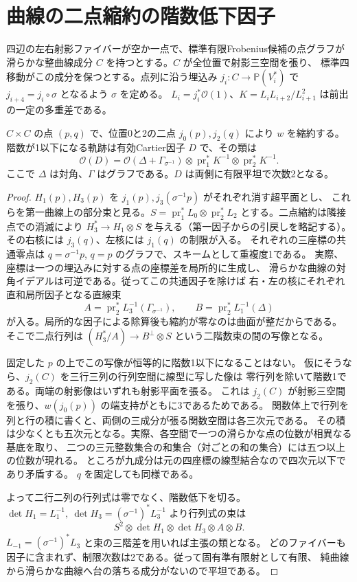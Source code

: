 \section{曲線の二点縮約の階数低下因子}
\label{sec:opposite-curve-divisor}
四辺の左右射影ファイバーが空か一点で、標準有限Frobenius候補の点グラフが
滑らかな整曲線成分 $C$ を持つとする。$C$ が全位置で射影三空間を張り、
標準四移動がこの成分を保つとする。点列に沿う埋込み $j_i:C\to\mathbb P(V_i^*)$
で $j_{i+4}=j_i\circ\sigma$ となるよう $\sigma$ を定める。
$L_i=j_i^*\mathcal O(1)$、$K=L_i L_{i+2}/L_{i+1}^2$ は前出の一定の多重差である。
\begin{theorem}\label{thm:opposite-curve-divisor}
$C\times C$ の点 $(p,q)$ で、位置0と2の二点 $j_0(p),j_2(q)$ により $w$ を縮約する。
階数が1以下になる軌跡は有効Cartier因子 $D$ で、その類は
\[
 \mathcal O(D)=\mathcal O(\Delta+\Gamma_{\sigma^{-1}})
       \otimes\operatorname{pr}_1^*K^{-1}\otimes\operatorname{pr}_2^*K^{-1}.
\]
ここで $\Delta$ は対角、$\Gamma$ はグラフである。$D$ は両側に有限平坦で次数2となる。
\end{theorem}
\begin{proof}
$H_1(p),H_3(p)$ を $j_1(p),j_3(\sigma^{-1}p)$ がそれぞれ消す超平面とし、
これらを第一曲線上の部分束と見る。$S=\operatorname{pr}_1^*L_0\otimes
\operatorname{pr}_2^*L_2$ とする。二点縮約は隣接点での消滅により
$H_3^*\to H_1\otimes S$ を与える（第一因子からの引戻しを略記する）。
その右核には $j_3(q)$、左核には $j_1(q)$ の制限が入る。
それぞれの三座標の共通零点は $q=\sigma^{-1}p$, $q=p$ のグラフで、スキームとして重複度1である。
実際、座標は一つの埋込みに対する点の座標差を局所的に生成し、
滑らかな曲線の対角イデアルは可逆である。従ってこの共通因子を除けば
右・左の核にそれぞれ直和局所因子となる直線束
\[
 A=\operatorname{pr}_2^*L_3^{-1}(\Gamma_{\sigma^{-1}}),\qquad
 B=\operatorname{pr}_2^*L_1^{-1}(\Delta)
\]
が入る。局所的な因子による除算後も縮約が零なのは曲面が整だからである。
そこで二点行列は $(H_3^*/A)\to B^\perp\otimes S$ という二階数束の間の写像となる。

固定した $p$ の上でこの写像が恒等的に階数1以下になることはない。
仮にそうなら、$j_2(C)$ を三行三列の行列空間に線型に写した像は
零行列を除いて階数1である。両端の射影像はいずれも射影平面を張る。
これは $j_2(C)$ が射影三空間を張り、$w(j_0(p))$ の端支持がともに3であるためである。
関数体上で行列を列と行の積に書くと、両側の三成分が張る関数空間は各三次元である。
その積は少なくとも五次元となる。実際、各空間で一つの滑らかな点の位数が相異なる基底を取り、
二つの三元整数集合の和集合（対ごとの和の集合）には五つ以上の位数が現れる。
ところが九成分は元の四座標の線型結合なので四次元以下であり矛盾する。
$q$ を固定しても同様である。

よって二行二列の行列式は零でなく、階数低下を切る。
$\det H_1=L_1^{-1},\ \det H_3=(\sigma^{-1})^*L_3^{-1}$ より行列式の束は
\[
 S^2\otimes \det H_1\otimes\det H_3\otimes A\otimes B.
\]
$L_{-1}=(\sigma^{-1})^*L_3$ と束の三階差を用いれば主張の類となる。
どのファイバーも因子に含まれず、制限次数は2である。従って固有準有限射として有限、
純曲線から滑らかな曲線へ台の落ちる成分がないので平坦である。
\end{proof}

